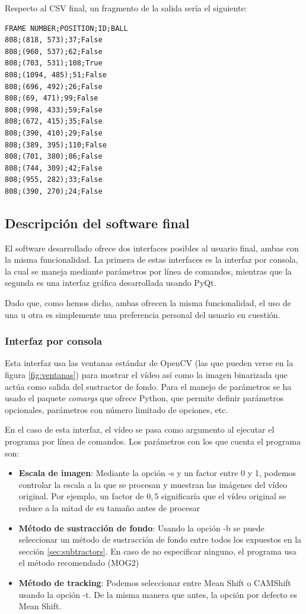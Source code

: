 Respecto al CSV final, un fragmento de la salida sería el siguiente:
\begin{lstlisting}
FRAME NUMBER;POSITION;ID;BALL
808;(818, 573);37;False
808;(960, 537);62;False
808;(703, 531);108;True
808;(1094, 485);51;False
808;(696, 492);26;False
808;(69, 471);99;False
808;(998, 433);59;False
808;(672, 415);35;False
808;(390, 410);29;False
808;(389, 395);110;False
808;(701, 380);86;False
808;(744, 309);42;False
808;(955, 282);33;False
808;(390, 270);24;False
\end{lstlisting}

\subsection{Descripción del software final}

El software desarrollado ofrece dos interfaces posibles al usuario final, ambas con la misma funcionalidad. La primera de estas interfaces es la interfaz por consola, la cual se maneja mediante parámetros por línea de comandos, mientras que la segunda es una interfaz gráfica desarrollada usando PyQt.

Dado que, como hemos dicho, ambas ofrecen la misma funcionalidad, el uso de una u otra es simplemente una preferencia personal del usuario en cuestión.

\subsubsection*{Interfaz por consola}
Esta interfaz usa las ventanas estándar de OpenCV (las que pueden verse en la figura \ref{fig:ventanas}) para mostrar el vídeo así como la imagen binarizada que actúa como salida del sustractor de fondo. Para el manejo de parámetros se ha usado el paquete \textit{comargs} que ofrece Python, que permite definir parámetros opcionales, parámetros con número limitado de opciones, etc.

En el caso de esta interfaz, el vídeo se pasa como argumento al ejecutar el programa por línea de comandos. Los parámetros con los que cuenta el programa son:

\begin{itemize}
  \item \textbf{Escala de imagen}: Mediante la opción -s y un factor entre 0 y 1, podemos controlar la escala a la que se procesan y muestran las imágenes del vídeo original. Por ejemplo, un factor de $0,5$ significaría que el vídeo original se reduce a la mitad de su tamaño antes de procesar
  \item \textbf{Método de sustracción de fondo}: Usando la opción -b se puede seleccionar un método de sustracción de fondo entre todos los expuestos en la sección \ref{sec:subtractors}. En caso de no especificar ninguno, el programa usa el método recomendado (MOG2)
  \item \textbf{Método de tracking}: Podemos seleccionar entre Mean Shift o CAMShift usando la opción -t. De la misma manera que antes, la opción por defecto es Mean Shift.
\end{itemize}

